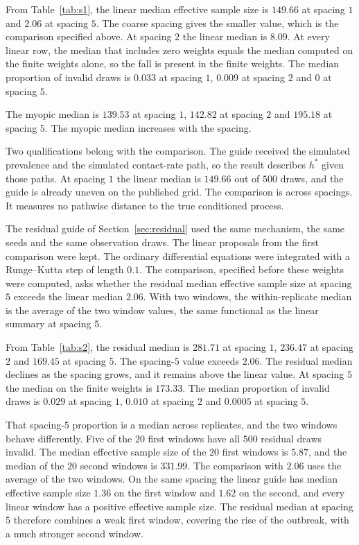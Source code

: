 From Table~\ref{tab:s1}, the linear median effective sample size is \(149.66\) at spacing \(1\) and \(2.06\) at spacing \(5\). The coarse spacing gives the smaller value, which is the comparison specified above. At spacing \(2\) the linear median is \(8.09\). At every linear row, the median that includes zero weights equals the median computed on the finite weights alone, so the fall is present in the finite weights. The median proportion of invalid draws is \(0.033\) at spacing \(1\), \(0.009\) at spacing \(2\) and \(0\) at spacing \(5\).

The myopic median is \(139.53\) at spacing \(1\), \(142.82\) at spacing \(2\) and \(195.18\) at spacing \(5\). The myopic median increases with the spacing.

Two qualifications belong with the comparison. The guide received the simulated prevalence and the simulated contact-rate path, so the result describes \(h^{*}\) given those paths. At spacing \(1\) the linear median is \(149.66\) out of \(500\) draws, and the guide is already uneven on the published grid. The comparison is across spacings. It measures no pathwise distance to the true conditioned process.

The residual guide of Section~\ref{sec:residual} used the same mechanism, the same seeds and the same observation draws. The linear proposals from the first comparison were kept. The ordinary differential equations were integrated with a Runge--Kutta step of length \(0.1\). The comparison, specified before these weights were computed, asks whether the residual median effective sample size at spacing \(5\) exceeds the linear median \(2.06\). With two windows, the within-replicate median is the average of the two window values, the same functional as the linear summary at spacing \(5\).



From Table~\ref{tab:s2}, the residual median is \(281.71\) at spacing \(1\), \(236.47\) at spacing \(2\) and \(169.45\) at spacing \(5\). The spacing-\(5\) value exceeds \(2.06\). The residual median declines as the spacing grows, and it remains above the linear value. At spacing \(5\) the median on the finite weights is \(173.33\). The median proportion of invalid draws is \(0.029\) at spacing \(1\), \(0.010\) at spacing \(2\) and \(0.0005\) at spacing \(5\).

That spacing-\(5\) proportion is a median across replicates, and the two windows behave differently. Five of the \(20\) first windows have all \(500\) residual draws invalid. The median effective sample size of the \(20\) first windows is \(5.87\), and the median of the \(20\) second windows is \(331.99\). The comparison with \(2.06\) uses the average of the two windows. On the same spacing the linear guide has median effective sample size \(1.36\) on the first window and \(1.62\) on the second, and every linear window has a positive effective sample size. The residual median at spacing \(5\) therefore combines a weak first window, covering the rise of the outbreak, with a much stronger second window.
